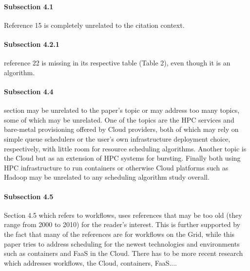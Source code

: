 \paragraph{Subsection 4.1}

Reference 15 is completely unrelated to the citation context.


\paragraph{Subsection 4.2.1}

reference 22 is missing in its respective table
(Table 2), even though it is an algorithm.


\paragraph{Subsection 4.4}

section may be unrelated to the paper's topic or may address
too many topics, some of which may be unrelated. One of the topics are
the HPC services and bare-metal provisioning offered by Cloud
providers, both of which may rely on simple queue schedulers or the
user's own infrastructure deployment choice, respectively, with little
room for resource scheduling algorithms. Another topic is the Cloud
but as an extension of HPC systems for bursting. Finally both using
HPC infrastructure to run containers or otherwise Cloud platforms such
as Hadoop may be unrelated to any scheduling algorithm study overall.


\paragraph{Subsection 4.5}

Section 4.5 which refers to workflows, uses references that may
be too old (they range from 2000 to 2010) for the reader's interest.
This is further supported by the fact that many of the references are
for workflows on the Grid, while this paper tries to address
scheduling for the newest technologies and environments such as
containers and FaaS in the Cloud. There has to be more recent research
which addresses workflows, the Cloud, containers, FaaS....



